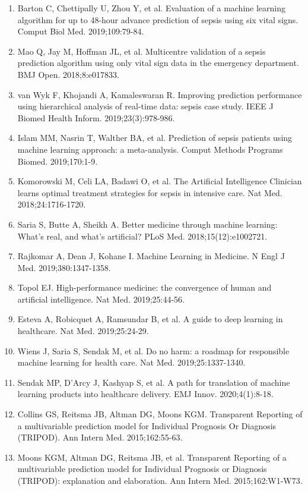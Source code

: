 \documentclass[11pt]{article}
\begin{document}
\begin{enumerate}
\item Barton C, Chettipally U, Zhou Y, et al. Evaluation of a machine learning algorithm for up to 48-hour advance prediction of sepsis using six vital signs. Comput Biol Med. 2019;109:79-84.
\item Mao Q, Jay M, Hoffman JL, et al. Multicentre validation of a sepsis prediction algorithm using only vital sign data in the emergency department. BMJ Open. 2018;8:e017833.
\item van Wyk F, Khojandi A, Kamaleswaran R. Improving prediction performance using hierarchical analysis of real-time data: sepsis case study. IEEE J Biomed Health Inform. 2019;23(3):978-986.
\item Islam MM, Nasrin T, Walther BA, et al. Prediction of sepsis patients using machine learning approach: a meta-analysis. Comput Methods Programs Biomed. 2019;170:1-9.
\item Komorowski M, Celi LA, Badawi O, et al. The Artificial Intelligence Clinician learns optimal treatment strategies for sepsis in intensive care. Nat Med. 2018;24:1716-1720.
\item Saria S, Butte A, Sheikh A. Better medicine through machine learning: What's real, and what's artificial? PLoS Med. 2018;15(12):e1002721.
\item Rajkomar A, Dean J, Kohane I. Machine Learning in Medicine. N Engl J Med. 2019;380:1347-1358.
\item Topol EJ. High-performance medicine: the convergence of human and artificial intelligence. Nat Med. 2019;25:44-56.
\item Esteva A, Robicquet A, Ramsundar B, et al. A guide to deep learning in healthcare. Nat Med. 2019;25:24-29.
\item Wiens J, Saria S, Sendak M, et al. Do no harm: a roadmap for responsible machine learning for health care. Nat Med. 2019;25:1337-1340.
\item Sendak MP, D'Arcy J, Kashyap S, et al. A path for translation of machine learning products into healthcare delivery. EMJ Innov. 2020;4(1):8-18.
\item Collins GS, Reitsma JB, Altman DG, Moons KGM. Transparent Reporting of a multivariable prediction model for Individual Prognosis Or Diagnosis (TRIPOD). Ann Intern Med. 2015;162:55-63.
\item Moons KGM, Altman DG, Reitsma JB, et al. Transparent Reporting of a multivariable prediction model for Individual Prognosis or Diagnosis (TRIPOD): explanation and elaboration. Ann Intern Med. 2015;162:W1-W73.

\end{enumerate}
\end{document}
